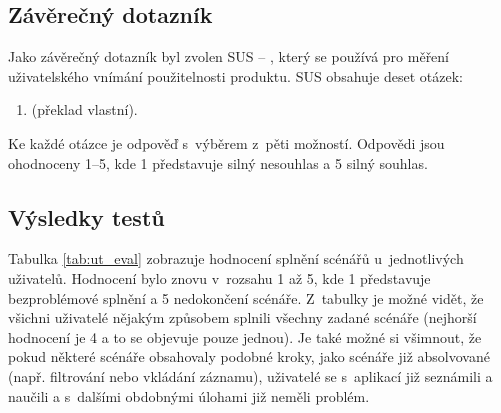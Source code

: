 \documentclass[thesis=M,czech]{FITthesis}[2012/06/26]
\begin{document}
\subsection{Závěrečný dotazník}
Jako závěrečný dotazník byl zvolen SUS -- , který se používá pro měření uživatelského vnímání použitelnosti produktu. SUS obsahuje deset otázek:
\begin{enumerate}
 \item {} (překlad vlastní).
\end{enumerate}
Ke každé otázce je odpověď s~výběrem z~pěti možností. Odpovědi jsou ohodnoceny 1--5, kde 1 představuje silný nesouhlas a 5 silný souhlas. \cite{sus}

\subsection{Výsledky testů}
Tabulka \ref{tab:ut_eval} zobrazuje hodnocení splnění scénářů u~jednotlivých uživatelů. Hodnocení bylo znovu v~rozsahu 1 až 5, kde 1 představuje bezproblémové splnění a 5 nedokončení scénáře.  Z~tabulky je možné vidět, že všichni uživatelé nějakým způsobem splnili všechny zadané scénáře (nejhorší hodnocení je 4 a to se objevuje pouze jednou). Je také možné si všimnout, že pokud některé scénáře obsahovaly podobné kroky, jako scénáře již absolvované (např. filtrování nebo vkládání záznamu), uživatelé se s~aplikací již seznámili a naučili a s~dalšími obdobnými úlohami již neměli problém.
\end{document}
